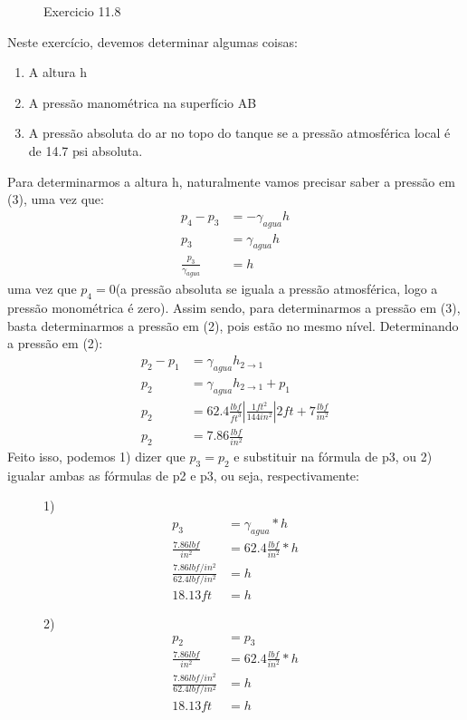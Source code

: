 \documentclass{article}
\begin{document}
\begin{figure}[!h]
     \centering
     \def\svgwidth{0.8\textwidth}
     
     \caption{\label{fig:exercicio11.8} Exercicio 11.8}
     \hfill
\end{figure}

Neste exercício, devemos determinar algumas coisas:
\begin{enumerate}
     \item A altura h
     \item A pressão manométrica na superfício AB
     \item A pressão absoluta do ar no topo do tanque se a pressão atmosférica local é de 14.7 psi absoluta.
\end{enumerate}

Para determinarmos a altura h, naturalmente vamos precisar saber a pressão em (3), uma vez que:
\begin{align*}
     p_4-p_3&=-\gamma_{agua}h\\
     p_3&=\gamma_{agua}h\\
     \frac{p_3}{\gamma_{agua}}&=h
\end{align*}
uma vez que $p_4=0$(a pressão absoluta se iguala a pressão atmosférica, logo a pressão monométrica é zero).
Assim sendo, para determinarmos a pressão em (3), basta determinarmos a pressão em (2), pois estão no mesmo nível.
Determinando a pressão em (2):
\begin{align*}
     p_2-p_1&=\gamma_{agua}h_{2\rightarrow1}\\
     p_2&=\gamma_{agua}h_{2\rightarrow1}+p_1\\
     p_2&=62.4\frac{lbf}{ft^3}\left|\frac{1ft^2}{144in^2}\right|2ft+7\frac{lbf}{in^2}\\
     p_2&=7.86\frac{lbf}{in^2}
\end{align*}
\newpage
Feito isso, podemos 1) dizer que $p_3=p_2$ e substituir na fórmula de p3, ou 2) igualar ambas as fórmulas de p2 e p3, ou seja, respectivamente:

\begin{figure}[!h]
\centering
\begin{minipage}{0.5\textwidth}
     1)
     \begin{align*}
     p_3&=\gamma_{agua}*h\\
     \frac{7.86lbf}{in^2}&=62.4\frac{lbf}{in^2}*h\\
     \frac{7.86lbf/in^2}{62.4lbf/in^2}&=h\\
     18.13ft&=h
\end{align*}
\end{minipage}\hfill
\begin{minipage}{0.5\textwidth}
     2)
   \begin{align*}
     p_2&=p_3\\
     \frac{7.86lbf}{in^2}&=62.4\frac{lbf}{in^2}*h\\
     \frac{7.86lbf/in^2}{62.4lbf/in^2}&=h\\
     18.13ft&=h
\end{align*}
\end{minipage}
\end{figure}
\end{document}
